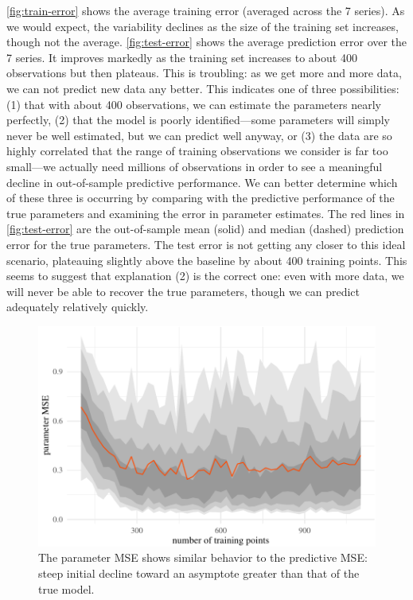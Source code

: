\documentclass[11pt]{article}
\begin{document}
\autoref{fig:train-error} shows the average training error (averaged
across the 7 series). As we would expect, the variability declines as
the size of the training set increases, though not the average.
\autoref{fig:test-error} shows the average prediction error over the 7
series. It improves markedly as the training set increases to about 400
observations but then plateaus. This is troubling: as we get more and
more data, we can not predict new data any better. This indicates one of
three possibilities: (1) that with about 400 observations, we can
estimate the parameters nearly perfectly, (2) that the model is poorly
identified---some parameters will simply never be well estimated, but we
can predict well anyway, or (3) the data are so highly correlated that
the range of training observations we consider is far too small---we
actually need millions of observations in order to see a meaningful
decline in out-of-sample predictive performance. We can better determine
which of these three is occurring by comparing with the predictive
performance of the true parameters and examining the error in parameter
estimates. The red lines in \autoref{fig:test-error} are the
out-of-sample mean (solid) and median (dashed) prediction error for the
true parameters. The test error is not getting any closer to this ideal
scenario, plateauing slightly above the baseline by about 400 training
points. This seems to suggest that explanation (2) is the correct one:
even with more data, we will never be able to recover the true
parameters, though we can predict adequately relatively quickly.

\begin{figure}[t]

{\centering \includegraphics{gfx/parm-error-1} 

}

\caption{The parameter MSE shows similar behavior to the predictive MSE: steep initial decline toward an asymptote greater than that of the true model.}\label{fig:parm-error}
\end{figure}
\end{document}
